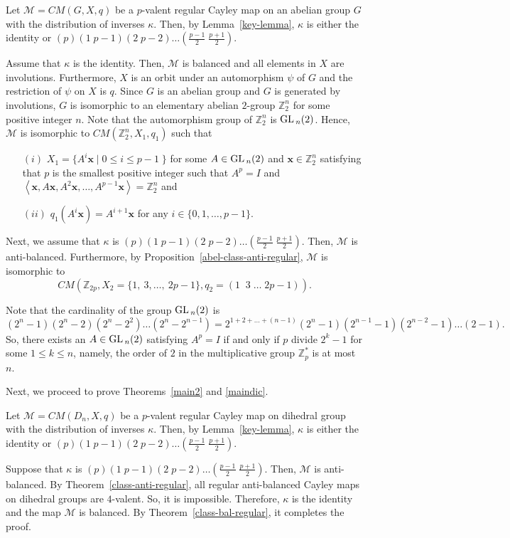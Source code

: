 \documentclass[12pt]{amsart}
\begin{document}
\begin{pfA}
Let $\mathcal{ M} = CM(G, X, q)$ be a $p$-valent regular Cayley
map on an abelian group $G$ with the distribution of inverses
$\kappa$. Then, by Lemma~\ref{key-lemma}, $\kappa$ is either the
identity or $(p)(1\;p-1)(2\;p-2)\ldots(\frac{p-1}{2} \;
\frac{p+1}{2})$.

Assume that $\kappa$ is the identity. Then, $\mathcal{ M}$ is
balanced and all elements in $X$ are involutions. Furthermore, $X$
is an orbit under an automorphism $\psi$ of $G$ and the
restriction of $\psi$ on $X$ is $q$. Since $G$ is an abelian group
and $G$ is generated by involutions, $G$ is isomorphic to an
elementary abelian $2$-group $\mathbb{Z}_{2}^{n}$ for some
positive integer $n$. Note that the automorphism group of
$\mathbb{Z}_{2}^{n}$ is ${\mbox{\rm GL\,}}_n(2)$. Hence, $\mathcal{ M}$ is
isomorphic to $CM(\mathbb{Z}_{2}^{n}, X_1, q_1)$ such that
\begin{enumerate} \item[$(i)$] $ X_1 = \{A^i \mathbf{x}
\mid  0 \leq i \leq p-1\; \}$ for some $A \in {\mbox{\rm GL\,}}_n(2)$ and $
\mathbf{x} \in \mathbb{Z}_{2}^{n}$ satisfying that $p$ is the
smallest positive integer such that $A^{p} = I$ and $\left<
\mathbf{x}, A \mathbf{x}, A^2 \mathbf{x}, \ldots,
A^{p-1}\mathbf{x} \right> = \mathbb{Z}_{2}^{n}$ and
 \item[$(ii)$] $q_1(A^i
\mathbf{x}) = A^{i+1} \mathbf{x}$ for any $i \in
\{0,1,\ldots,p-1\}$. \end{enumerate}
 Next, we assume that $\kappa$ is
$(p)(1\;p-1)(2\;p-2)\ldots(\frac{p-1}{2} \; \frac{p+1}{2})$. Then,
$\mathcal{ M}$ is anti-balanced. Furthermore, by
Proposition~\ref{abel-class-anti-regular}, $\mathcal{ M}$ is
isomorphic to
$$CM(\mathbb{Z}_{2p}, X_2 = \{ 1,\ 3, \ldots, \ 2p-1 \}, q_2 =
(1\;\;3\; \ldots \;2p-1)).  $$
\end{pfA}

Note that the cardinality of the group ${\mbox{\rm GL\,}}_n(2)$ is
$$(2^n -1)(2^n - 2)(2^n - 2^2)\ldots(2^n -2^{n-1}) =
2^{1+2+\ldots+(n-1)}(2^n -1)(2^{n-1} - 1)(2^{n-2} - 1)\ldots(2
-1).$$ So, there exists an $A \in {\mbox{\rm GL\,}}_n(2)$
satisfying $A^p = I$ if and only if $p$ divide $2^k - 1$ for some
$1 \leq k \leq n$, namely, the order of $2$ in
the multiplicative group $\mathbb{Z}^*_p$ is at most $n$.

Next, we proceed to prove Theorems~\ref{main2} and \ref{maindic}.

\begin{pfB}
Let $\mathcal{M} = CM(D_n, X, q)$ be a $p$-valent regular Cayley
map on dihedral group with the distribution of inverses $\kappa$.
Then, by Lemma~\ref{key-lemma}, $\kappa$ is either the identity or
$(p)(1\;p-1)(2\;p-2)\ldots(\frac{p-1}{2} \; \frac{p+1}{2})$.

Suppose that $\kappa$ is $(p)(1\;p-1)(2\;p-2)\ldots(\frac{p-1}{2}
\; \frac{p+1}{2})$. Then, $\mathcal{ M}$ is anti-balanced. By
Theorem~\ref{class-anti-regular}, all regular anti-balanced Cayley
maps on dihedral groups are $4$-valent. So, it is impossible.
Therefore,  $\kappa$ is the identity and the map $\mathcal{ M}$ is
balanced. By Theorem~\ref{class-bal-regular}, it completes the
proof.
\end{pfB}
\end{document}
